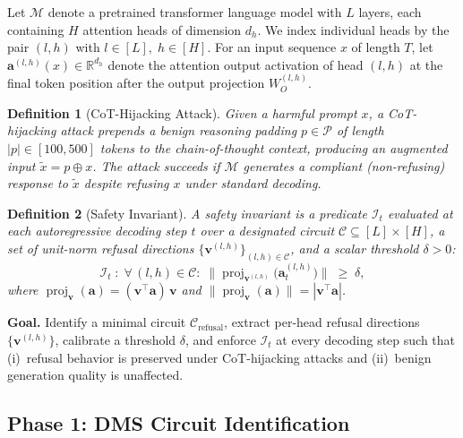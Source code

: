 \documentclass[11pt]{article}
\newtheorem{definition}{Definition}
\begin{document}
Let $\mathcal{M}$ denote a pretrained transformer language model with $L$ layers, each containing $H$ attention heads of dimension $d_h$. We index individual heads by the pair $(l,h)$ with $l\in[L],\; h\in[H]$. For an input sequence $x$ of length $T$, let $\mathbf{a}^{(l,h)}(x)\in\mathbb{R}^{d_h}$ denote the attention output activation of head $(l,h)$ at the final token position after the output projection $W_O^{(l,h)}$.

\begin{definition}[CoT-Hijacking Attack]
\label{def:hijack}
Given a harmful prompt $x$, a \emph{CoT-hijacking attack} prepends a benign reasoning padding $p\in\mathcal{P}$ of length $|p|\in[100,500]$ tokens to the chain-of-thought context, producing an augmented input $\tilde{x} = p \oplus x$. The attack succeeds if $\mathcal{M}$ generates a compliant (non-refusing) response to $\tilde{x}$ despite refusing $x$ under standard decoding.
\end{definition}

\begin{definition}[Safety Invariant]
\label{def:invariant}
A \emph{safety invariant} is a predicate $\mathcal{I}_t$ evaluated at each autoregressive decoding step $t$ over a designated circuit $\mathcal{C}\subseteq [L]\times[H]$, a set of unit-norm \emph{refusal directions} $\{{\mathbf{v}}^{(l,h)}\}_{(l,h)\in\mathcal{C}}$, and a scalar threshold $\delta>0$:
\begin{equation}
\label{eq:invariant}
\mathcal{I}_t \;:\; \forall\,(l,h)\in\mathcal{C}:\;\big\|\operatorname{proj}_{{\mathbf{v}}^{(l,h)}}\!\big(\mathbf{a}^{(l,h)}_t\big)\big\| \;\geq\; \delta,
\end{equation}
where $\operatorname{proj}_{\mathbf{v}}(\mathbf{a}) = (\mathbf{v}^\top \mathbf{a})\,\mathbf{v}$ and $\|\operatorname{proj}_{\mathbf{v}}(\mathbf{a})\| = |\mathbf{v}^\top \mathbf{a}|$.
\end{definition}

\noindent\textbf{Goal.} Identify a minimal circuit $\mathcal{C}_{\mathrm{refusal}}$, extract per-head refusal directions $\{\mathbf{v}^{(l,h)}\}$, calibrate a threshold $\delta$, and enforce $\mathcal{I}_t$ at every decoding step such that (i)~refusal behavior is preserved under CoT-hijacking attacks and (ii)~benign generation quality is unaffected.

\subsection{Phase 1: DMS Circuit Identification}
\label{subsec:dms}
\end{document}
